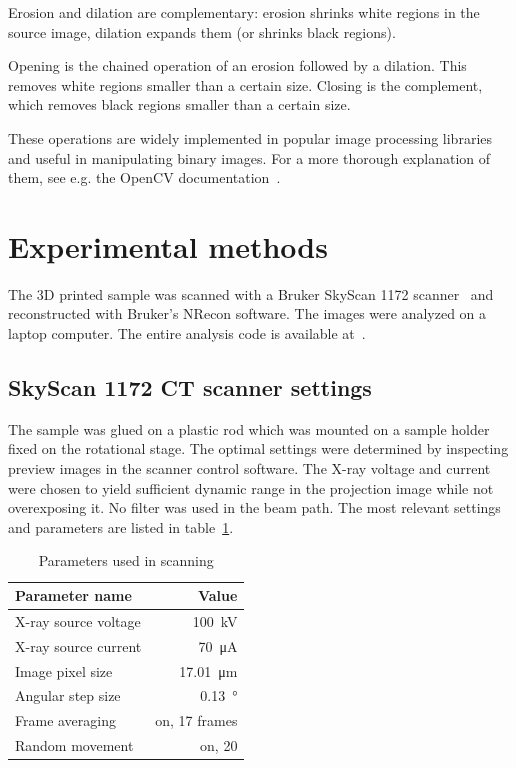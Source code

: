 \documentclass[a4paper,twoside,12pt]{article}
\begin{document}
Erosion and dilation are complementary: erosion shrinks white regions in the source image, dilation expands them (or shrinks black regions).

Opening is the chained operation of an erosion followed by a dilation. This removes white regions smaller than a certain size. Closing is the complement, which removes black regions smaller than a certain size.

These operations are widely implemented in popular image processing libraries and useful in manipulating binary images. For a more thorough explanation of them, see e.g. the OpenCV documentation~\cite{cv1, cv2}.

\section{Experimental methods}
The 3D printed sample was scanned with a Bruker SkyScan 1172 scanner~\cite{skyscan} and reconstructed with Bruker's NRecon software. The images were analyzed on a laptop computer. The entire analysis code is available at~\cite{code}.

\subsection{SkyScan 1172 CT scanner settings}
The sample was glued on a plastic rod which was mounted on a sample holder fixed on the rotational stage. The optimal settings were determined by inspecting preview images in the scanner control software. The X-ray voltage and current were chosen to yield sufficient dynamic range in the projection image while not overexposing it. No filter was used in the beam path. The most relevant settings and parameters are listed in table~\ref{table:settings}.

\begin{table}
    \centering
    \caption{Parameters used in scanning}
    \label{table:settings}
    \begin{tabular}{lr}
        \toprule
        Parameter name & Value \\
        \midrule
        X-ray source voltage & \SI{100}{\kilo\volt} \\
        X-ray source current & \SI{70}{\micro\ampere} \\
        Image pixel size & \SI{17.01}{\micro\meter} \\
        Angular step size & \SI{0.13}{\degree} \\
        Frame averaging & on, 17 frames \\
        Random movement & on, 20 \\
        \bottomrule
    \end{tabular}
\end{table}
\end{document}
